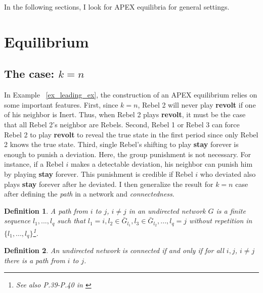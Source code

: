 \documentclass[12pt,letterpaper]{article}
\newtheorem{definition}{Definition}[section]
\theoremstyle{definition}
\theoremstyle{remark}
\theoremstyle{claim}
\begin{document}
In the following sections, I look for APEX equilibria for general settings.

\section{Equilibrium}
\label{sec:equilibrium}
\subsection{The case: $k=n$}

In Example ~\ref{ex_leading_ex}, the construction of an APEX equilibrium relies on some important features. First, since $k=n$, Rebel 2 will never play \textbf{revolt} if one of his neighbor is Inert. Thus, when Rebel 2 plays \textbf{revolt}, it must be the case that all Rebel 2's neighbor are Rebels.  Second, Rebel 1 or Rebel 3 can force Rebel 2 to play \textbf{revolt} to reveal the true state in the first period since only Rebel 2 knows the true state. Third, single Rebel's shifting to play \textbf{stay} forever is enough to punish a deviation. Here, the group punishment is not necessary. For instance, if a Rebel $i$ makes a detectable deviation, his neighbor can punish him by playing \textbf{stay} forever. This punishment is credible if Rebel $i$ who deviated also plays \textbf{stay} forever after he deviated. I then generalize the result for $k=n$ case after defining the \textit{path} in a network and \textit{connectedness}.

\begin{definition}
A path from $i$ to $j$, $i\neq j$ in an undirected network $G$ is a finite sequence $l_1,...,l_q$ such that $l_1=i, l_2\in \bar{G}_{l_1}, l_3\in \bar{G}_{l_2},...,l_q=j$ without repetition in $\{l_1,...,l_q\}$\footnote{See also P.39-P.40 in \citep{gross2005graph}}.  
\end{definition}

\begin{definition}
An undirected network is connected if and only if for all $i,j$, $i\neq j$ there is a path from $i$ to $j$. 
\end{definition}
\end{document}
